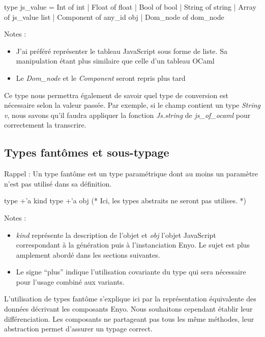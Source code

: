 \documentclass[11pt,a4paper]{report}
\begin{document}
\begin{OCaml}
  type js_value = Int of int | Float of float
                | Bool of bool | String of string
                | Array of js_value list 
                | Component of any_id obj | Dom_node of dom_node
\end{OCaml}

Notes : 
\begin{itemize}
\item J'ai préféré représenter le tableau JavaScript sous forme de liste. Sa manipulation étant 
  plus similaire que celle d'un tableau OCaml
\item Le \emph{Dom\_node} et le \emph{Component} seront repris plus tard 
\end{itemize}

Ce type nous permettra également de savoir quel type de conversion est nécessaire selon 
la valeur passée.
Par exemple, si le champ contient un type \emph{String v}, nous savons qu'il faudra appliquer
la fonction \emph{Js.string} de \emph{js\_of\_ocaml} pour correctement la transcrire.

\subsection{Types fantômes et sous-typage}

Rappel : Un type fantôme est un type paramétrique dont au moins un paramètre n'est pas utilisé
dans sa définition.

\begin{OCaml}
  type +'a kind
  type +'a obj
  (* Ici, les types abstraits ne seront pas utilises. *)
\end{OCaml}

Notes : 
\begin{itemize}
\item \emph{kind} représente la description de l'objet et \emph{obj} l'objet JavaScript correspondant
  à la génération puis à l'instanciation Enyo. Le sujet est plus amplement abordé dans les sections
  suivantes.
\item Le signe ``plus'' indique l'utilisation covariante du type qui sera nécessaire pour l'usage
  combiné aux variants.
\end{itemize}

L'utilisation de types fantôme s'explique ici par la représentation équivalente des données décrivant
les composants Enyo. Nous souhaitons cependant établir leur différenciation. 
Les composants ne partageant pas tous les même méthodes, leur abstraction permet d'assurer 
un typage correct.
\end{document}
